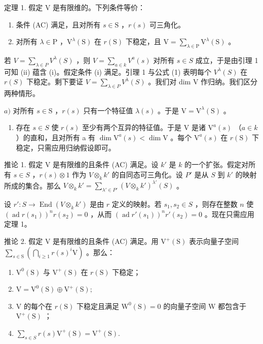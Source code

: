 定理 1. 假定 V 是有限维的。下列条件等价：

\begin{enumerate}
\def\labelenumi{(\roman{enumi})}
\item
  条件 (AC) 满足，且对所有 \(s \in \mathrm{S}\) ，\(r(s)\) 可三角化。
\item
  对所有 \(\lambda \in \mathrm{P}\) ，\(\mathrm{V}^{\lambda}(\mathrm{S})\) 在 \(r(\mathrm{S})\) 下稳定，且 \(\mathrm{V} = \sum_{\lambda \in \mathrm{P}} \mathrm{V}^{\lambda}(\mathrm{S})\) 。
\end{enumerate}

若 \(V = \sum_{\lambda \in P} V^{\lambda}(S)\) ，则 \(V = \sum_{a \in k} V^{a}(s)\) 对所有 \(s \in S\) 成立，于是由引理 1 可知 (ii) 蕴含 (i)。假定条件 (i) 满足。引理 1 与公式 (1) 表明每个 \(V^{\lambda}(S)\) 在 \(r(S)\) 下稳定。剩下要证 \(V = \sum_{\lambda \in P} V^{\lambda}(S)\) 。我们对 dim V 作归纳。我们区分两种情形。

\(a)\) 对所有 \(s \in \mathrm{S}\) ，\(r(s)\) 只有一个特征值 \(\lambda(s)\) 。于是 \(\mathrm{V} = \mathrm{V}^{\lambda}(\mathrm{S})\) 。

\begin{enumerate}
\def\labelenumi{\alph{enumi})}
\setcounter{enumi}{1}
\tightlist
\item
  存在 \(s \in S\) 使 \(r(s)\) 至少有两个互异的特征值。于是 V 是诸 \(\mathrm{V}^{a}(s)\) （\(a \in k\) ）的直和，且对所有 a 有 \(\dim \mathrm{V}^{a}(s) < \dim \mathrm{V}\) 。每个 \(\mathrm{V}^{a}(s)\) 在 \(r(\mathrm{S})\) 下稳定，只需应用归纳假设即可。
\end{enumerate}

推论 1. 假定 V 是有限维的且条件 (AC) 满足。设 \(k'\) 是 \(k\) 的一个扩张。假定对所有 \(s \in S\) ，\(r(s) \otimes 1\) 作为 \(V \otimes_k k'\) 的自同态可三角化。设 \(P'\) 是从 \(S\) 到 \(k'\) 的映射所成的集合。那么 \(V \otimes_k k' = \sum_{\lambda' \in P'} (V \otimes_k k')^{\lambda'}(S)\) 。

设 \(r': S \to \operatorname{End}(V \otimes_k k')\) 是由 \(r\) 定义的映射。若 \(s_1, s_2 \in S\) ，则存在整数 \(n\) 使 \((\operatorname{ad} r(s_1))^n r(s_2) = 0\) ，从而 \((\operatorname{ad} r'(s_1))^n r'(s_2) = 0\) 。现在只需应用定理 1。

推论 2. 假定 V 是有限维的且条件 (AC) 满足。用 \(\mathrm{V}^{+}(\mathrm{S})\) 表示向量子空间 \(\sum_{s\in \mathrm{S}}\left(\bigcap_{i\geq 1}r(s)^{i}\mathrm{V}\right)\) 。那么：

\begin{enumerate}
\def\labelenumi{(\roman{enumi})}
\item
  \(\mathrm{V}^0 (\mathrm{S})\) 与 \(\mathrm{V^{+}(S)}\) 在 \(r(\mathrm{S})\) 下稳定；
\item
  \(\mathrm{V} = \mathrm{V}^{0}(\mathrm{S}) \oplus \mathrm{V}^{+}(\mathrm{S});\)
\item
  V 的每个在 \(r(\mathrm{S})\) 下稳定且满足 \(\mathrm{W}^0 (\mathrm{S}) = 0\) 的向量子空间 W 都包含于 \(\mathrm{V}^{+}(\mathrm{S})\) ；
\item
  \(\sum_{s\in S}r(s)\mathrm{V}^{+}(\mathrm{S}) = \mathrm{V}^{+}(\mathrm{S}).\)
\end{enumerate}

